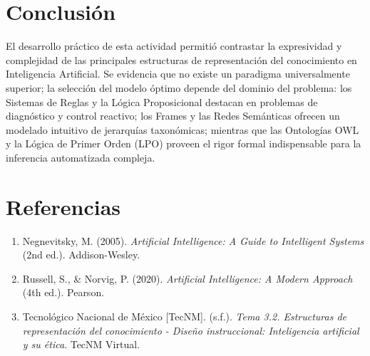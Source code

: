 \documentclass[11pt,letterpaper]{article}
\begin{document}
\section{Conclusión}

El desarrollo práctico de esta actividad permitió contrastar la expresividad y complejidad de las principales estructuras de representación del conocimiento en Inteligencia Artificial. Se evidencia que no existe un paradigma universalmente superior; la selección del modelo óptimo depende del dominio del problema: los Sistemas de Reglas y la Lógica Proposicional destacan en problemas de diagnóstico y control reactivo; los Frames y las Redes Semánticas ofrecen un modelado intuitivo de jerarquías taxonómicas; mientras que las Ontologías OWL y la Lógica de Primer Orden (LPO) proveen el rigor formal indispensable para la inferencia automatizada compleja.

\vspace{1.5em} %

\section*{Referencias}

\small
\begin{enumerate}
  \item Negnevitsky, M. (2005). \textit{Artificial Intelligence: A Guide to Intelligent Systems} (2nd ed.). Addison-Wesley.
  \item Russell, S., \& Norvig, P. (2020). \textit{Artificial Intelligence: A Modern Approach} (4th ed.). Pearson.
  \item Tecnológico Nacional de México [TecNM]. (s.f.). \textit{Tema 3.2. Estructuras de representación del conocimiento - Diseño instruccional: Inteligencia artificial y su ética}. TecNM Virtual.
\end{enumerate}

\end{document}
